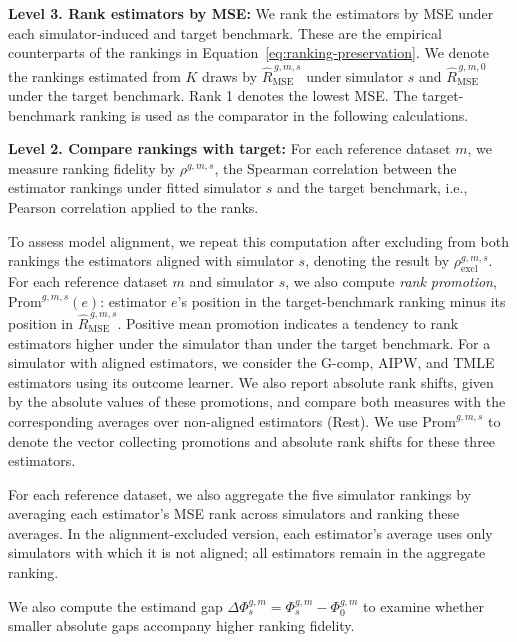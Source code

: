 \medskip

\noindent\textbf{Level 3. Rank estimators by MSE:} We rank the estimators by MSE under each simulator-induced and target benchmark. These are the empirical counterparts of the rankings in Equation~\eqref{eq:ranking-preservation}. We denote the rankings estimated from \(K\) draws by \(\widehat R_{\mathrm{MSE}}^{\,g,m,s}\) under simulator \(s\) and \(\widehat R_{\mathrm{MSE}}^{\,g,m,0}\) under the target benchmark. Rank 1 denotes the lowest MSE. The target-benchmark ranking is used as the comparator in the following calculations.

\medskip

\noindent\textbf{Level 2. Compare rankings with target:} For each reference dataset \(m\), we measure ranking fidelity by \(\rho^{g,m,s}\), the Spearman correlation between the estimator rankings under fitted simulator \(s\) and the target benchmark, i.e., Pearson correlation applied to the ranks.

To assess model alignment, we repeat this computation after excluding from both rankings the estimators aligned with simulator \(s\), denoting the result by \(\rho_{\mathrm{excl}}^{g,m,s}\). For each reference dataset \(m\) and simulator \(s\), we also compute \emph{rank promotion}, \(\mathrm{Prom}^{g,m,s}(e)\): estimator \(e\)'s position in the target-benchmark ranking minus its position in \(\widehat R_{\mathrm{MSE}}^{\,g,m,s}\). Positive mean promotion indicates a tendency to rank estimators higher under the simulator than under the target benchmark. For a simulator with aligned estimators, we consider the G-comp, AIPW, and TMLE estimators using its outcome learner. We also report absolute rank shifts, given by the absolute values of these promotions, and compare both measures with the corresponding averages over non-aligned estimators (Rest). We use \(\boldsymbol{\mathrm{Prom}}^{g,m,s}\) to denote the vector collecting promotions and absolute rank shifts for these three estimators.

For each reference dataset, we also aggregate the five simulator rankings by averaging each estimator's MSE rank across simulators and ranking these averages. In the alignment-excluded version, each estimator's average uses only simulators with which it is not aligned; all estimators remain in the aggregate ranking.

We also compute the estimand gap \(\Delta\Phi_s^{g,m}=\Phi_s^{g,m}-\Phi_0^{g,m}\) to examine whether smaller absolute gaps accompany higher ranking fidelity.

